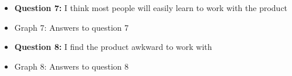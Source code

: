 \documentclass{article}
\begin{document}
\begin{itemize}
		\item[] \textbf{Question 7:} I think most people will easily learn to work with the product
		\item[] \begin{minipage}[t]{\linewidth}
         	 \raggedright
          	\medskip
          	\centerline{Graph 7: Answers to question 7}
          \end{minipage}
\end{itemize}
\newpage
\begin{itemize}
		\item[] \textbf{Question 8:} I find the product awkward to work with
		\item[] \begin{minipage}[t]{\linewidth}
         	 \raggedright
          	\medskip
          	\centerline{Graph 8: Answers to question 8}
          \end{minipage}
\end{itemize}
\end{document}
